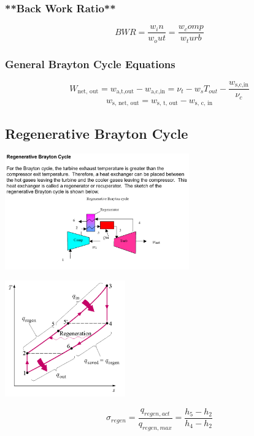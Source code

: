 \documentclass[10pt,landscape]{article}
\newenvironment{Figure}
     {\par\medskip\noindent\minipage{\linewidth}}
     {\endminipage\par\medskip}
\begin{document}
\begin{multicols}{3}
\subsubsection{**Back Work Ratio**}
\begin{equation}
    BWR=\frac{w_in}{w_out}=\frac{w_comp}{w_turb}
\end{equation}
\subsubsection{General Brayton Cycle Equations}
\begin{equation}
    W_{\text{net, out}}=w_{\text{a,t,out}}-w_{\text{a,c,in}}=\nu_t-w_sT_{out}-\frac{w_{\text{s,c,in}}}{\nu_c}
\end{equation}
\begin{equation}
    w_{\text{s, net, out}}=w_{\text{s, t, out}}-w_{\text{s, c, in}}
\end{equation}

\subsection{Regenerative Brayton Cycle}
\begin{Figure}
    \centering
    \includegraphics[width=\linewidth, height=5cm]{RegenerativeBrayton.png}
\end{Figure}
\begin{Figure}
    \centering
    \includegraphics[width=\linewidth, height=5cm]{BraytonRegenerative_TS_Diagram.png}
\end{Figure}
\begin{equation}
    \sigma_{regen}=\frac{q_{regen,act}}{q_{regen,max}}=\frac{h_5-h_2}{h_4-h_2}
\end{equation}

\end{multicols}
\end{document}
